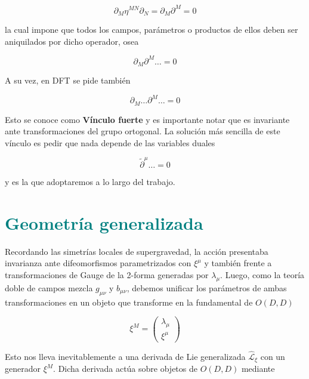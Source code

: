 \documentclass{article}
\numberwithin{equation}{section}
\begin{document}
\begin{equation}\label{key}
\partial_M\eta^{MN}\partial_N= \partial_M\partial^M = 0
\end{equation}

la cual impone que todos los campos, parámetros o productos de ellos deben ser aniquilados por dicho operador, osea

\begin{equation}\label{key}
\partial_M\partial^M \dots = 0
\end{equation}

A su vez, en DFT se pide también 

\begin{equation}\label{SC2}
\partial_M\dots\partial^M \dots = 0
\end{equation}

Esto se conoce como \textbf{Vínculo fuerte} y es importante notar que es invariante ante transformaciones del grupo ortogonal. La solución más sencilla de este vínculo es pedir que nada depende de las variables duales 

\begin{equation}\label{SC3}
\widetilde{\partial}^{\mu} \dots =0
\end{equation}

y es la que adoptaremos a lo largo del trabajo.


\section{\textcolor{teal}{Geometría generalizada}}\label{sec_geometriageneralizada}

Recordando las simetrías locales de supergravedad, la acción presentaba invarianza ante difeomorfismos parametrizados con $ \xi^{\mu} $ y también frente a transformaciones de Gauge de la 2-forma generadas por $ \lambda_{\mu} $. Luego, como la teoría doble de campos mezcla $ g_{\mu\nu} $ y $ b_{\mu\nu} $, debemos unificar los parámetros de ambas transformaciones en un objeto que transforme en la fundamental de $ O(D,D) $

\begin{equation}\label{key}
\xi^M=
\begin{pmatrix}
\lambda_{\mu}\\
\xi^{\mu}
\end{pmatrix}
\end{equation} 

Esto nos lleva inevitablemente a una derivada de Lie generalizada $ \hat{\mathcal{L}}_{\xi} $ con un generador $ \xi^M $. Dicha derivada actúa sobre objetos de $ O(D,D) $ mediante
\end{document}
